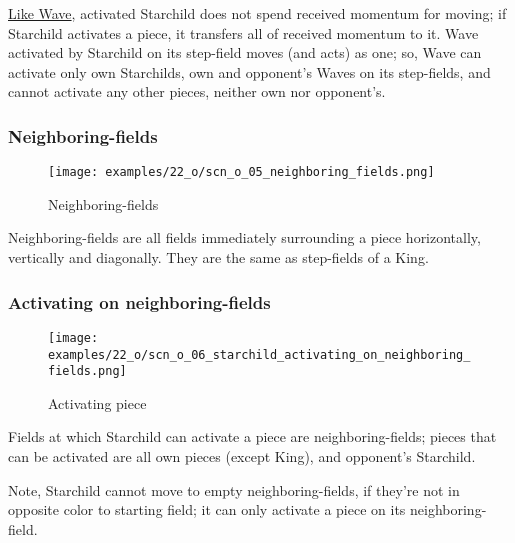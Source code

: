 \hyperref[fig:10_wave]{Like Wave}, activated Starchild does not spend received momentum
for moving; if Starchild activates a piece, it transfers all of received momentum to it.
Wave activated by Starchild on its step-field moves (and acts) as one; so, Wave can activate
only own Starchilds, own and opponent's Waves on its step-fields, and cannot activate any
other pieces, neither own nor opponent's.

\clearpage %

\subsubsection*{Neighboring-fields}

\noindent
\begin{wrapfigure}[5]{l}{0.4\textwidth}
\centering
\texttt{[image: examples/22\_o/scn\_o\_05\_neighboring\_fields.png]}
\caption{Neighboring-fields}
\label{fig:scn_o_05_neighboring_fields}
\end{wrapfigure}
Neighboring-fields are all fields immediately surrounding a piece horizontally, vertically
and diagonally. They are the same as step-fields of a King.

\vspace*{2.1\baselineskip}
\subsubsection*{Activating on neighboring-fields}

\noindent
\begin{wrapfigure}[7]{l}{0.4\textwidth}
\centering
\texttt{[image: examples/22\_o/scn\_o\_06\_starchild\_activating\_on\_neighboring\_fields.png]}
\caption{Activating piece}
\label{fig:scn_o_06_starchild_activating_on_neighboring_fields}
\end{wrapfigure}
Fields at which Starchild can activate a piece are neighboring-fields; pieces that can be
activated are all own pieces (except King), and opponent's Starchild.

Note, Starchild cannot move to empty neighboring-fields, if they're not in opposite color
to starting field; it can only activate a piece on its neighboring-field.

